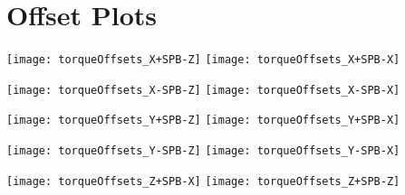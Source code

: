 
\chapter{Offset Plots}

\texttt{[image: torqueOffsets\_X+SPB-Z]}
\texttt{[image: torqueOffsets\_X+SPB-X]}

\texttt{[image: torqueOffsets\_X-SPB-Z]}
\texttt{[image: torqueOffsets\_X-SPB-X]}

\texttt{[image: torqueOffsets\_Y+SPB-Z]}
\texttt{[image: torqueOffsets\_Y+SPB-X]}

\texttt{[image: torqueOffsets\_Y-SPB-Z]}
\texttt{[image: torqueOffsets\_Y-SPB-X]}

\texttt{[image: torqueOffsets\_Z+SPB-X]}
\texttt{[image: torqueOffsets\_Z+SPB-Z]}


